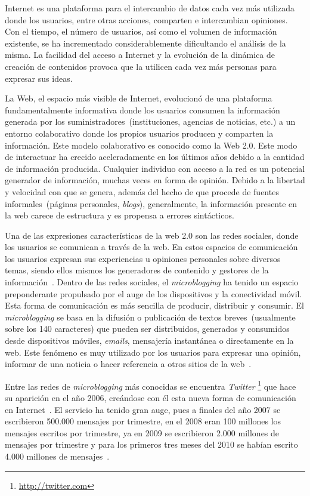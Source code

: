 \begin{introduction}

Internet es una plataforma para el intercambio de datos
cada vez más utilizada donde los usuarios, entre otras
acciones, comparten e intercambian opiniones. Con el tiempo, el número 
de usuarios, así como el volumen de información existente, se ha incrementado
considerablemente dificultando el análisis de la
misma. La facilidad del acceso a Internet y la evolución 
de la dinámica de creación de contenidos provoca que la utilicen
cada vez más personas para expresar sus ideas.

La Web, el espacio más visible de Internet, evolucionó de una plataforma fundamentalmente informativa
donde los usuarios consumen la información generada por los suministradores~(instituciones,
agencias de noticias, etc.) a un entorno colaborativo donde los propios usuarios producen
y comparten la información. Este modelo colaborativo es conocido como la Web 2.0. 
Este modo de interactuar ha crecido aceleradamente en los
últimos años debido a la cantidad de información producida. Cualquier individuo con acceso
a la red es un potencial generador de información, muchas veces en forma de opinión.
Debido a la libertad y velocidad con que se genera, además del hecho
de que procede de fuentes informales~(páginas personales, \emph{blogs}),
generalmente, la información presente en la web carece de estructura
y es propensa a errores sintácticos.

Una de las expresiones características de la web 2.0 son las redes
sociales, donde los usuarios 
se comunican a través de la web. En estos espacios de comunicación los
usuarios expresan sus experiencias u opiniones
personales sobre diversos temas, siendo ellos mismos
los generadores de contenido y gestores de la información~\cite{Bollen}.
Dentro de las redes sociales, el \emph{microblogging} ha tenido un espacio 
preponderante propulsado por el auge de los dispositivos y la  
conectividad móvil.
Esta forma de comunicación es más sencilla de
producir, distribuir y consumir. El \emph{microblogging} se basa en la
difusión o publicación de textos breves~(usualmente sobre los 140 caracteres) que
pueden ser distribuidos, generados y consumidos desde
dispositivos móviles, \emph{emails}, mensajería instantánea o directamente en la web. 
Este fenómeno es muy utilizado por los
usuarios para expresar una opinión, informar de una noticia o hacer referencia 
a otros sitios de la web~\cite{Bollen}.

Entre las redes de \emph{microblogging} más conocidas se encuentra \emph{Twitter}
\footnote{\href{http://twitter.com}{http://twitter.com}} 
que hace su aparición en
el año 2006, creándose con él esta nueva forma de comunicación en Internet~\cite{Merlo2010}.
El servicio ha tenido gran
auge, pues a finales del año 2007 se escribieron 500.000 mensajes por trimestre, en el 2008
eran 100 millones los mensajes escritos por trimestre, ya en 2009 se escribieron 2.000 millones de
mensajes por trimestre y para los primeros tres meses del 2010 se habían 
escrito 4.000 millones de mensajes~\cite{Merlo2010}.


\end{introduction}
